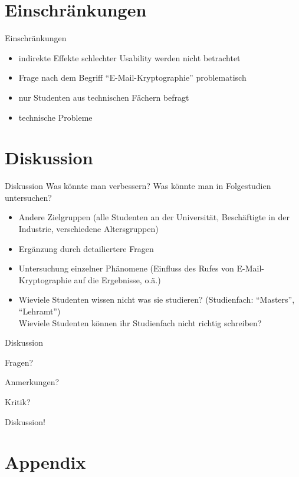 \documentclass[]{beamer}
\begin{document}
\section{Einschränkungen}
\begin{frame}{Einschränkungen}
	  \begin{itemize}
    \item indirekte Effekte schlechter Usability werden nicht betrachtet
    \item Frage nach dem Begriff ``E-Mail-Kryptographie'' problematisch
    \item nur Studenten aus technischen Fächern befragt
    \item technische Probleme
	\end{itemize}
\end{frame}

\section{Diskussion}
\begin{frame}{Diskussion}
	Was könnte man verbessern? Was könnte man in Folgestudien untersuchen?
	\begin{itemize}[<+->]
		\item Andere Zielgruppen (alle Studenten an der Universität, Beschäftigte in der Industrie, verschiedene Altersgruppen)
		\item Ergänzung durch detailiertere Fragen
		\item Untersuchung einzelner Phänomene (Einfluss des Rufes von E-Mail-Kryptographie auf die Ergebnisse, o.ä.)
		\item Wieviele Studenten wissen nicht was sie studieren? (Studienfach: ``Masters'', ``Lehramt'')\\
			Wieviele Studenten können ihr Studienfach nicht richtig schreiben?
	\end{itemize}
\end{frame}

\begin{frame}{Diskussion}
  \begin{center}
	Fragen?

	Anmerkungen?
    
	Kritik?
    
	Diskussion!
	\end{center}
\end{frame}

\appendix
\section{Appendix}
\end{document}
